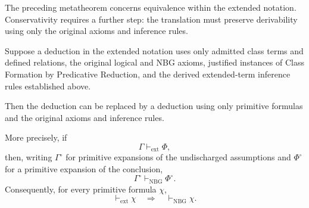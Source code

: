 The preceding metatheorem concerns equivalence within the
extended notation. Conservativity requires a further
step: the translation must preserve derivability using
only the original axioms and inference rules.

\begin{metatheorem}
\label{meta:conservativity-of-class-term-notation}
Suppose a deduction in the extended notation uses only
admitted class terms and defined relations, the original
logical and NBG axioms, justified instances of Class
Formation by Predicative Reduction, and the derived
extended-term inference rules established above.

Then the deduction can be replaced by a deduction using
only primitive formulas and the original axioms and
inference rules.

More precisely, if
\[
\Gamma\vdash_{\mathrm{ext}}\Phi,
\]
then, writing \(\Gamma^\circ\) for primitive expansions
of the undischarged assumptions and \(\Phi^\circ\) for
a primitive expansion of the conclusion,
\[
\Gamma^\circ\vdash_{\mathrm{NBG}}\Phi^\circ.
\]
Consequently, for every primitive formula \(\chi\),
\[
\vdash_{\mathrm{ext}}\chi
\quad\Longrightarrow\quad
\vdash_{\mathrm{NBG}}\chi.
\]
\end{metatheorem}

